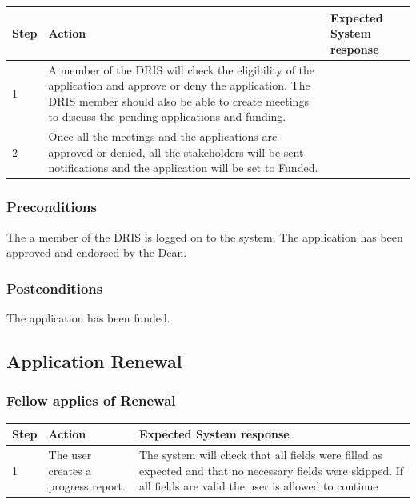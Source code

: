 \documentclass[12pt]{article}
\begin{document}
\begin{center}
\begin{tabular}{|l|p{6cm}|p{8cm}|}
\hline
Step & Action & Expected System response \\
\hline
1 & A member of the DRIS will check the eligibility of the application and approve or deny the application. The DRIS member should also be able to create meetings to discuss the pending applications and funding. \\
\hline
2 & Once all the meetings and the applications are approved or denied, all the stakeholders will be sent notifications and the application will be set to Funded. \\
\hline
\end{tabular}
\end{center}

\subsubsection*{Preconditions}
The a member of the DRIS is logged on to the system. The application has been approved and endorsed by the Dean.

\subsubsection*{Postconditions}
The application has been funded.

\subsection{Application Renewal}

\subsubsection{Fellow applies of Renewal}

\begin{center}
\begin{tabular}{|l|p{6cm}|p{8cm}|}
\hline
Step & Action & Expected System response \\
\hline
1 & The user creates a progress report. & The system will check that all fields were filled as expected and that no necessary fields were skipped. If all fields are valid the user is allowed to continue \\
\hline

\end{tabular}
\end{center}
\end{document}
